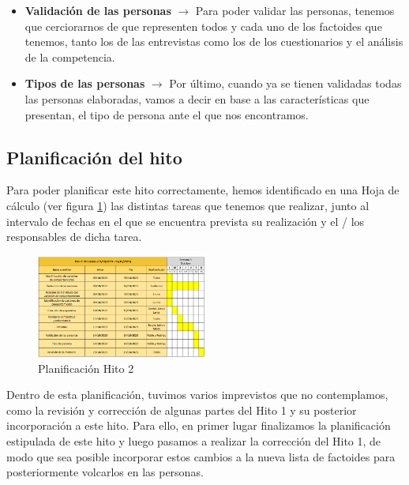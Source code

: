 \begin{itemize}
    \item \textbf{Validación de las personas} $\rightarrow$ Para poder validar las personas, tenemos que cerciorarnos de que representen todos y cada uno de los factoides que tenemos, tanto los de las entrevistas como los de los cuestionarios y el análisis de la competencia.
    \item \textbf{Tipos de las personas} $\rightarrow$ Por último, cuando ya se tienen validadas todas las personas elaboradas, vamos a decir en base a las características que presentan, el tipo de persona ante el que nos encontramos.
\end{itemize}

\subsection{Planificación del hito}
Para poder planificar este hito correctamente, hemos identificado en una Hoja de cálculo (ver figura \ref{fig:planif-hito2}) las distintas tareas que tenemos que 
realizar, junto al intervalo de fechas en el que se encuentra prevista su realización y el / los responsables de dicha tarea.

\begin{figure}[H]
    \centering 
    \includegraphics[width=0.5\textwidth]{./Imagenes/Planificaciones/Planif-hito2.png}
    \caption{Planificación Hito 2}
    \label{fig:planif-hito2}
\end{figure}

Dentro de esta planificación, tuvimos varios imprevistos que no contemplamos, como la revisión y corrección de algunas partes del Hito 1 y su posterior incorporación a este hito. Para ello, en primer lugar finalizamos la planificación estipulada de este hito y luego pasamos a realizar la corrección del Hito 1, de modo que sea posible incorporar estos cambios a la nueva lista de factoides para posteriormente volcarlos en las personas.
